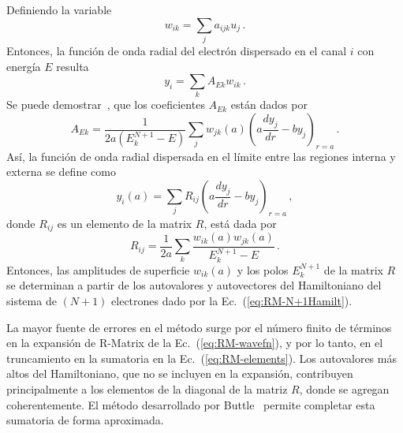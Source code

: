 Definiendo la variable
\begin{equation}
w_{ik}=\sum_j a_{ijk}u_j\,.
\end{equation}
Entonces, la función de onda radial del electrón dispersado en el canal 
$i$ con energía $E$ resulta
\begin{equation}
y_i=\sum_kA_{Ek}w_{ik}\,.
\end{equation}
Se puede demostrar~\cite{Burke:75}, que los coeficientes $A_{Ek}$ 
están dados por
\begin{equation}
A_{Ek}=\frac{1}{2a\left(E_k^{N+1}-E\right)}\sum_jw_{jk}(a)
\left(a\frac{dy_j}{dr}-by_j\right)_{r=a}\,.
\end{equation}
Así, la función de onda radial dispersada en el límite entre las 
regiones interna y externa se define como
\begin{equation}
y_i(a)=\sum_j R_{ij}\left(a\frac{dy_j}{dr}-by_j\right)_{r=a}\,,
\end{equation}
donde $R_{ij}$ es un elemento de la matrix $R$, está dada por
\begin{equation}
R_{ij} = \frac{1}{2a}\sum_k\frac{w_{ik}(a)w_{jk}(a)}{E_k^{N+1}-E}\,.
\label{eq:RM-elements}
\end{equation}
Entonces, las amplitudes de superficie $w_{ik}(a)$ y los polos 
$E_k^{N+1}$ de la matrix $R$ se determinan a partir de los autovalores y
autovectores del Hamiltoniano del sistema de $(N+1)$ electrones dado por 
la Ec.~(\ref{eq:RM-N+1Hamilt}).

La mayor fuente de errores en el método surge por el número finito de 
términos en la expansión de R-Matrix de la Ec.~(\ref{eq:RM-wavefn}), y 
por lo tanto, en el truncamiento en la sumatoria en la 
Ec.~(\ref{eq:RM-elements}). Los autovalores más altos del Hamiltoniano,
que no se incluyen en la expansión, contribuyen principalmente a los 
elementos de la diagonal de la matriz $R$, donde se agregan 
coherentemente. El método desarrollado por Buttle~\cite{Buttle} permite 
completar esta sumatoria de forma aproximada. 

